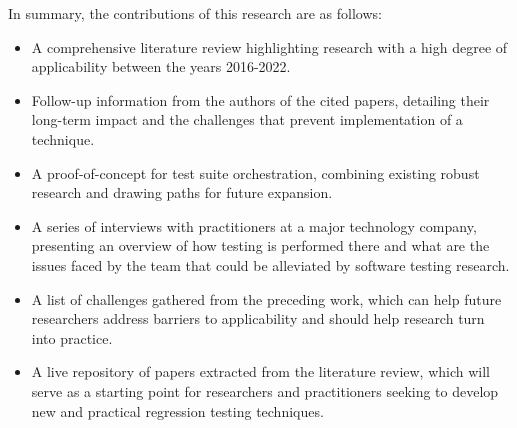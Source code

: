 In summary, the contributions of this research are as follows:
\begin{itemize}
	\item A comprehensive literature review highlighting research with a high degree of applicability between the years 2016-2022.
	\item Follow-up information from the authors of the cited papers, detailing their long-term impact and the challenges that prevent implementation of a technique.
	\item A proof-of-concept for test suite orchestration, combining existing robust research and drawing paths for future expansion.
	\item A series of interviews with practitioners at a major technology company, presenting an overview of how testing is performed there and what are the issues faced by the team that could be alleviated by software testing research.
	\item A list of challenges gathered from the preceding work, which can help future researchers address barriers to applicability and should help research turn into practice.
	\item A live repository of papers extracted from the literature review, which will serve as a starting point for researchers and practitioners seeking to develop new and practical regression testing techniques. 
\end{itemize}


%


